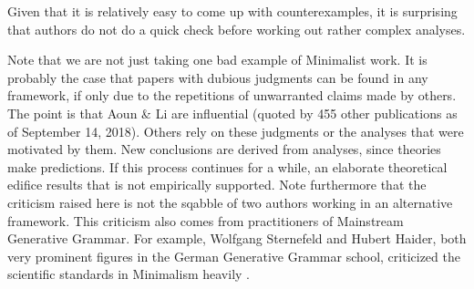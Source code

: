 \documentclass[output=paper
	        ,collection
	        ,collectionchapter
 	        ,biblatex
                ,babelshorthands
                ,newtxmath
                ,draftmode
                ,colorlinks, citecolor=brown
]{langscibook}
\begin{document}
\zl
%
Given that it is relatively easy to come up with counterexamples, it is surprising that authors do
not do a quick check before working out rather complex analyses.

Note that we are not just taking one bad example of Minimalist work. It is probably the case that
papers with dubious judgments can be found in any framework, if only due to the repetitions
of unwarranted claims made by others. The point is that Aoun \& Li are influential (quoted by 455
other publications as of September 14, 2018). Others rely on these judgments or the analyses that were
motivated by them. New conclusions are derived from analyses, since theories make predictions. If
this process continues for a while, an elaborate theoretical edifice results that is not
empirically supported. Note furthermore that the criticism raised here is not the sqabble of two
authors working in an alternative framework. This criticism also comes from practitioners of
Mainstream Generative Grammar. For example, Wolfgang Sternefeld and Hubert Haider, both very
prominent figures in the German Generative Grammar school, criticized the scientific standards in
Minimalism heavily \citep{%
SR2012a,Haider2018a}. 
\end{document}
